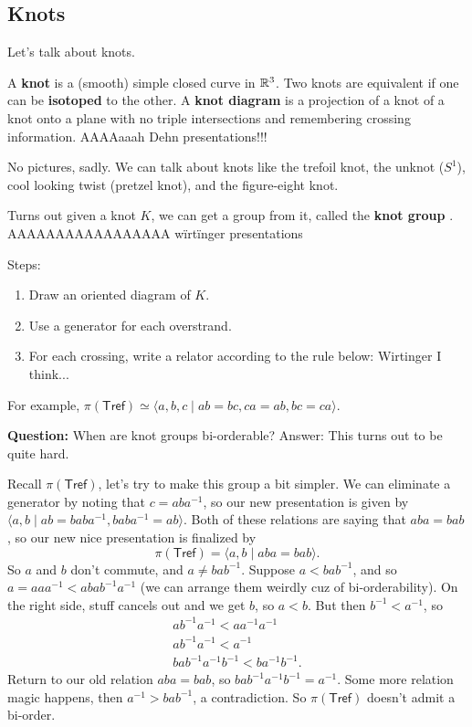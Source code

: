 \subsection{Knots}
Let's talk about knots.
\begin{definition}[Knot]
    A \textbf{knot} is a (smooth) simple closed curve in $\mathbb{R}^3$. Two knots are equivalent if one can be \textbf{isotoped} to the other. A \textbf{knot diagram} is a projection of a knot of a knot onto a plane with no triple intersections and remembering crossing information. AAAAaaah Dehn presentations!!!
\end{definition}
\begin{example}
    No pictures, sadly. We can talk about knots like the trefoil knot, the unknot ($S^{1} $), cool looking twist (pretzel knot), and the figure-eight knot.
\end{example}
Turns out given a knot $K$, we can get a group from it, called the \textbf{knot group} . AAAAAAAAAAAAAAAAA w\"irt\"inger presentations 

Steps:
\begin{enumerate}
    \item Draw an oriented diagram of $K$.
    \item Use a generator for each overstrand.
    \item For each crossing, write a relator according to the rule below: Wirtinger I think...
\end{enumerate}
\begin{example}
For example, $\pi(\mathsf{Tref} )\simeq \langle a,b,c \mid ab=bc,ca=ab,bc=ca \rangle $.
\end{example}

\noindent\textbf{Question:} When are knot groups bi-orderable?
\noindent Answer: This turns out to be quite hard.

Recall $\pi(\mathsf{Tref} )$, let's try to make this group a bit simpler. We can eliminate a generator by noting that $c=aba^{-1}$, so our new presentation is given by $\langle a,b \mid ab=baba^{-1},baba^{-1}=ab \rangle $. Both of these relations are saying that $aba=bab$, so our new nice presentation is finalized by \[
    \pi(\mathsf{Tref} )=\langle a,b \mid aba=bab \rangle .
\] So $a$ and $b$ don't commute, and $a\neq bab^{-1}$. Suppose $a<bab^{-1}$, and so $a=aaa^{-1}<abab^{-1}a^{-1}$ (we can arrange them weirdly cuz of bi-orderability). On the right side, stuff cancels out and we get $b$, so $a<b$. But then $b^{-1}<a^{-1}$, so 
\begin{gather*}
    ab^{-1}a^{-1}<aa^{-1}a^{-1}\\
    ab^{-1}a^{-1}<a^{-1}\\
    bab^{-1}a^{-1}b^{-1}<ba^{-1}b^{-1}.
\end{gather*}
Return to our old relation $aba=bab$, so $bab^{-1}a^{-1}b^{-1}=a^{-1}$. Some more relation magic happens, then $a^{-1}>bab^{-1}$, a contradiction. So $\pi(\mathsf{Tref} )$ doesn't admit a bi-order.


